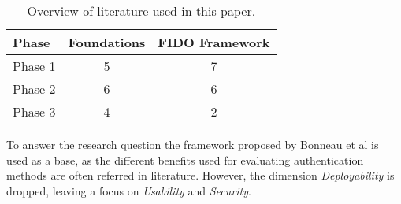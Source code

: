 \begin{table}[ht]
    \centering
    \caption{Overview of literature used in this paper.}
    \label{tab:literature_review}
    \begin{tabular}{ l | c | c }
        \textbf{Phase} & \textbf{Foundations} & \textbf{FIDO Framework}\\
        \hline
        Phase 1 & 5 & 7\\
        Phase 2 & 6 & 6\\
        Phase 3 & 4 & 2\\
    \end{tabular}
\end{table}

To answer the research question the framework proposed by Bonneau et al \citep{bonneau2012} is used as a base, as the different benefits used for evaluating authentication methods are often referred in literature. However, the dimension \emph{Deployability} is dropped, leaving a focus on \emph{Usability} and \emph{Security}.